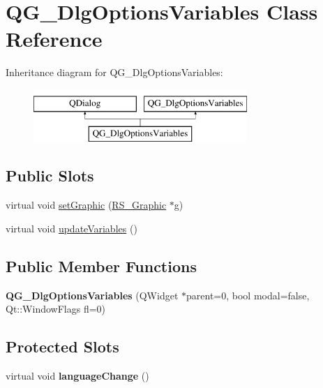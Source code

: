 \hypertarget{classQG__DlgOptionsVariables}{\section{Q\-G\-\_\-\-Dlg\-Options\-Variables Class Reference}
\label{classQG__DlgOptionsVariables}
}
Inheritance diagram for Q\-G\-\_\-\-Dlg\-Options\-Variables\-:\begin{figure}[H]
\begin{center}
\leavevmode
\includegraphics[height=2.000000cm]{classQG__DlgOptionsVariables}
\end{center}
\end{figure}
\subsection*{Public Slots}
\begin{DoxyCompactItemize}
\item 
virtual void \hyperlink{classQG__DlgOptionsVariables_a8965b3eed20629000c82518607e4ed26}{set\-Graphic} (\hyperlink{classRS__Graphic}{R\-S\-\_\-\-Graphic} $\ast$g)
\item 
virtual void \hyperlink{classQG__DlgOptionsVariables_a52c60176359168a19404594382fef8a1}{update\-Variables} ()
\end{DoxyCompactItemize}
\subsection*{Public Member Functions}
\begin{DoxyCompactItemize}
\item 
\hypertarget{classQG__DlgOptionsVariables_aa5d43096bb06d22d4a3d8881a7710525}{{\bfseries Q\-G\-\_\-\-Dlg\-Options\-Variables} (Q\-Widget $\ast$parent=0, bool modal=false, Qt\-::\-Window\-Flags fl=0)}\label{classQG__DlgOptionsVariables_aa5d43096bb06d22d4a3d8881a7710525}

\end{DoxyCompactItemize}
\subsection*{Protected Slots}
\begin{DoxyCompactItemize}
\item 
\hypertarget{classQG__DlgOptionsVariables_a3cc33fe8b13b6db3b19d1c9d286dc1f5}{virtual void {\bfseries language\-Change} ()}\label{classQG__DlgOptionsVariables_a3cc33fe8b13b6db3b19d1c9d286dc1f5}

\end{DoxyCompactItemize}


